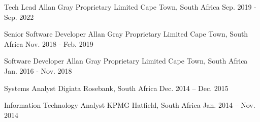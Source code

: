 

\begin{cventries}

  \cventry
    {Tech Lead} %
    {Allan Gray Proprietary Limited} %
    {Cape Town, South Africa} %
    {Sep. 2019 - Sep. 2022} %
    {}

  \cventry
    {Senior Software Developer} %
    {Allan Gray Proprietary Limited} %
    {Cape Town, South Africa} %
    {Nov. 2018 - Feb. 2019} %
    {}

  \cventry
    {Software Developer} %
    {Allan Gray Proprietary Limited} %
    {Cape Town, South Africa} %
    {Jan. 2016 - Nov. 2018} %
    {}

  \cventry
    {Systems Analyst} %
    {Digiata} %
    {Rosebank, South Africa} %
    {Dec. 2014 – Dec. 2015}%
    {}
    
  \cventry
    {Information Technology Analyst} %
    {KPMG} %
    {Hatfield, South Africa} %
    {Jan. 2014 – Nov. 2014} %
    {}
\end{cventries}

